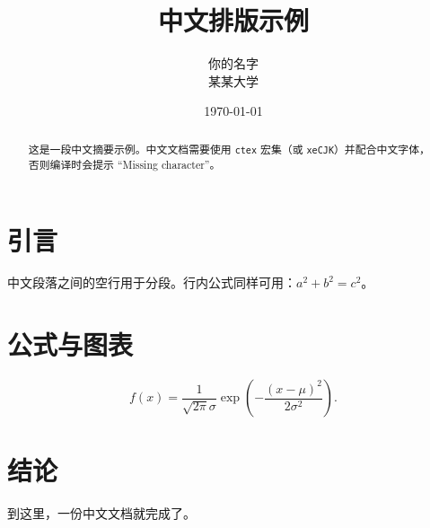 \documentclass[12pt,fontset=fandol]{ctexart}
\title{中文排版示例}
\author{你的名字 \\ 某某大学}
\date{\today}
\begin{document}
\maketitle

\begin{abstract}
  这是一段中文摘要示例。中文文档需要使用 \texttt{ctex} 宏集（或 \texttt{xeCJK}）并配合中文字体，
  否则编译时会提示 “Missing character”。
\end{abstract}

\section{引言}

中文段落之间的空行用于分段。行内公式同样可用：$a^2 + b^2 = c^2$。

\section{公式与图表}

\begin{equation}
  f(x) = \frac{1}{\sqrt{2\pi}\sigma}\exp\left(-\frac{(x-\mu)^2}{2\sigma^2}\right).
\end{equation}

\section{结论}

到这里，一份中文文档就完成了。
\end{document}
